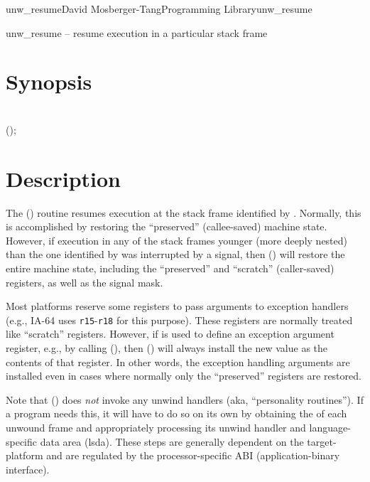 \documentclass{article}
\begin{document}
\begin{Name}{3}{unw\_resume}{David Mosberger-Tang}{Programming Library}{unw\_resume}

  unw\_resume -- resume execution in a particular stack frame
\end{Name}

\section{Synopsis}

\\

 ();\\

\section{Description}

The () routine resumes execution at the stack frame
identified by .  Normally, this is accomplished by
restoring the ``preserved'' (callee-saved) machine state.  However, if
execution in any of the stack frames younger (more deeply nested) than
the one identified by  was interrupted by a signal, then
() will restore the entire machine state, including
the ``preserved'' and ``scratch'' (caller-saved) registers, as well as
the signal mask.

Most platforms reserve some registers to pass arguments to exception
handlers (e.g., IA-64 uses \texttt{r15}-\texttt{r18} for this
purpose).  These registers are normally treated like ``scratch''
registers.  However, if  is used to define an
exception argument register, e.g., by calling (),
then () will always install the new value as the
contents of that register.  In other words, the exception handling
arguments are installed even in cases where normally only the
``preserved'' registers are restored.

Note that () does \emph{not} invoke any unwind
handlers (aka, ``personality routines'').  If a program needs this, it
will have to do so on its own by obtaining the 
of each unwound frame and appropriately processing its unwind handler
and language-specific data area (lsda).  These steps are generally
dependent on the target-platform and are regulated by the
processor-specific ABI (application-binary interface).
\end{document}
